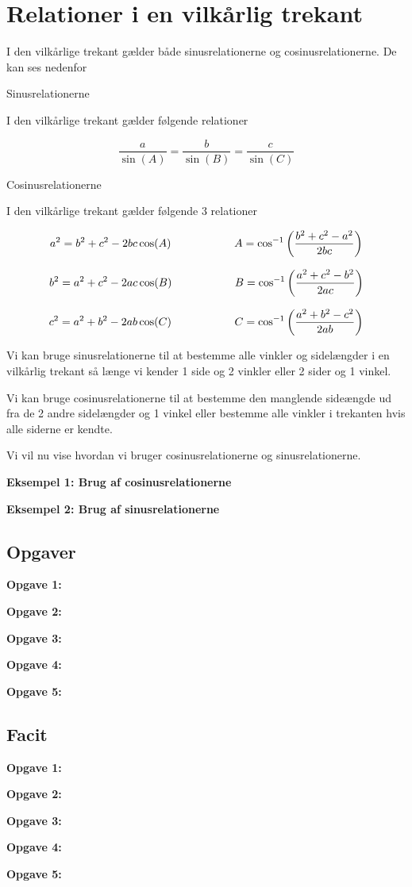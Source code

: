 \section*{Relationer i en vilkårlig trekant}

I den vilkårlige trekant gælder både sinusrelationerne og cosinusrelationerne. De kan ses nedenfor


\begin{frm-thm}{Sinusrelationerne}

I den vilkårlige trekant gælder følgende relationer

\[\frac{a}{\sin(A)} = \frac{b}{\sin(B)} = \frac{c}{\sin(C)}\]

\end{frm-thm}

\begin{frm-thm}{Cosinusrelationerne}

I den vilkårlige trekant gælder følgende 3 relationer

\[a^2 = b^2 + c^2 - 2bc\cos(A) \hspace*{2cm} A = \cos^{-1}\left(\frac{b^2 + c^2 - a^2}{2bc}\right)\]

\[b^2 = a^2 + c^2 - 2ac\cos(B) \hspace*{2cm} B = \cos^{-1}\left(\frac{a^2 + c^2 - b^2}{2ac}\right)\]

\[c^2 = a^2 + b^2 - 2ab\cos(C) \hspace*{2cm} C = \cos^{-1}\left(\frac{a^2 + b^2 - c^2}{2ab}\right)\]

\end{frm-thm}

Vi kan bruge sinusrelationerne til at bestemme alle vinkler og sidelængder i en vilkårlig trekant så længe vi kender 1 side og 2 vinkler eller 2 sider og 1 vinkel.

Vi kan bruge cosinusrelationerne til at bestemme den manglende sideængde ud fra de 2 andre sidelængder og 1 vinkel eller bestemme alle vinkler i trekanten hvis alle siderne er kendte.

Vi vil nu vise hvordan vi bruger cosinusrelationerne og sinusrelationerne.

\textbf{Eksempel 1: Brug af cosinusrelationerne}



\textbf{Eksempel 2: Brug af sinusrelationerne}



\subsection*{Opgaver}

\textbf{Opgave 1:}

\textbf{Opgave 2:}

\textbf{Opgave 3:}

\textbf{Opgave 4:}

\textbf{Opgave 5:}



\newpage


\subsection*{Facit}

\textbf{Opgave 1:}

\textbf{Opgave 2:}

\textbf{Opgave 3:}

\textbf{Opgave 4:}

\textbf{Opgave 5:}
